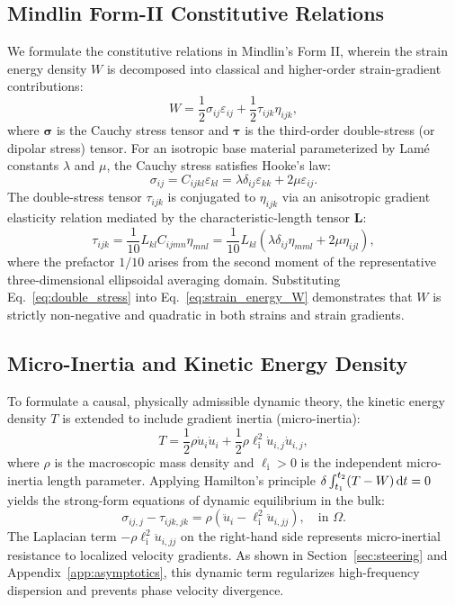 \subsection{Mindlin Form-II Constitutive Relations}
We formulate the constitutive relations in Mindlin's Form II, wherein the strain energy density $W$ is decomposed into classical and higher-order strain-gradient contributions:
\begin{equation}
W = \frac{1}{2}\sigma_{ij}\varepsilon_{ij} + \frac{1}{2}\tau_{ijk}\eta_{ijk},
\label{eq:strain_energy_W}
\end{equation}
where $\bm\sigma$ is the Cauchy stress tensor and $\bm\tau$ is the third-order double-stress (or dipolar stress) tensor. For an isotropic base material parameterized by Lam\'e constants $\lambda$ and $\mu$, the Cauchy stress satisfies Hooke's law:
\begin{equation}
\sigma_{ij} = C_{ijkl}\varepsilon_{kl} = \lambda \delta_{ij}\varepsilon_{kk} + 2\mu \varepsilon_{ij}.
\label{eq:cauchy_stress}
\end{equation}
The double-stress tensor $\tau_{ijk}$ is conjugated to $\eta_{ijk}$ via an anisotropic gradient elasticity relation mediated by the characteristic-length tensor $\mathbf{L}$:
\begin{equation}
\tau_{ijk} = \frac{1}{10} L_{kl} C_{ijmn}\eta_{mnl} = \frac{1}{10} L_{kl}\left(\lambda \delta_{ij}\eta_{mml} + 2\mu \eta_{ijl}\right),
\label{eq:double_stress}
\end{equation}
where the prefactor $1/10$ arises from the second moment of the representative three-dimensional ellipsoidal averaging domain. Substituting Eq.~\eqref{eq:double_stress} into Eq.~\eqref{eq:strain_energy_W} demonstrates that $W$ is strictly non-negative and quadratic in both strains and strain gradients.

\subsection{Micro-Inertia and Kinetic Energy Density}
To formulate a causal, physically admissible dynamic theory, the kinetic energy density $T$ is extended to include gradient inertia (micro-inertia):
\begin{equation}
T = \frac{1}{2}\rho \dot u_i \dot u_i + \frac{1}{2}\rho \ell_{\mathrm{i}}^2 \dot u_{i,j}\dot u_{i,j},
\label{eq:kinetic_energy_T}
\end{equation}
where $\rho$ is the macroscopic mass density and $\ell_{\mathrm{i}} > 0$ is the independent micro-inertia length parameter. Applying Hamilton's principle $\delta \int_{t_1}^{t_2} (T - W)\,\mathrm{d} t = 0$ yields the strong-form equations of dynamic equilibrium in the bulk:
\begin{equation}
\sigma_{ij,j} - \tau_{ijk,jk} = \rho\left(\ddot u_i - \ell_{\mathrm{i}}^2 \ddot u_{i,jj}\right), \quad \text{in } \Omega.
\label{eq:strong_form}
\end{equation}
The Laplacian term $-\rho \ell_{\mathrm{i}}^2 \ddot u_{i,jj}$ on the right-hand side represents micro-inertial resistance to localized velocity gradients. As shown in Section~\ref{sec:steering} and Appendix~\ref{app:asymptotics}, this dynamic term regularizes high-frequency dispersion and prevents phase velocity divergence.

